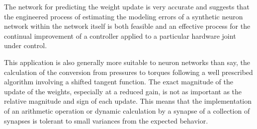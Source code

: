 
The network for predicting the weight update is very accurate and suggests that
the engineered process of estimating the modeling errors of a synthetic neuron
network within the network itself is both feasible and an effective process for
the continual improvement of a controller applied to a particular hardware
joint under control.

This application is also generally more suitable to neuron networks than say,
the calculation of the conversion from pressures to torques following a well
prescribed algorithm involving a shifted tangent function. The exact magnitude
of the update of the weights, especially at a reduced gain, is not as important
as the relative magnitude and sign of each update. This means that the
implementation of an arithmetic operation or dynamic calculation by a synapse of
a collection of synapses is tolerant to small variances from the expected
behavior.

